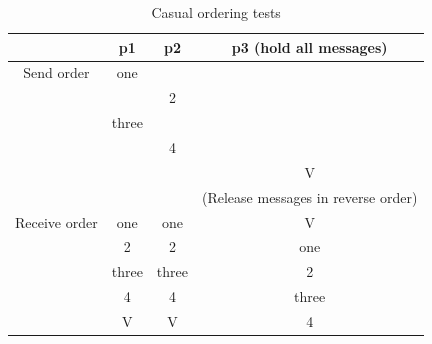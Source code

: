 \documentclass[titlepage, twocolumn, a4paper, 10pt]{article}
\begin{document}
\begin{table}[H]
  \centering
  \begin{footnotesize}
    \begin{tabular} {c | c | c | c}
      & p1 & p2 & p3 (hold all messages) \\
      \hline
      Send order & one &  &  \\
      &  & 2 &  \\
      & three &  &  \\
      &  & 4 &  \\
      &  &  & V \\
      \hline
      &  &  & (Release messages in reverse order) \\
      \hline
      Receive order & one & one & V \\
      & 2 & 2 & one \\
      & three & three & 2 \\
      & 4 & 4 & three \\
      & V & V & 4 \\
    \end{tabular}
  \end{footnotesize}
  \caption{Casual ordering tests}
  \label{tbl:casual}
\end{table}

\end{document}

